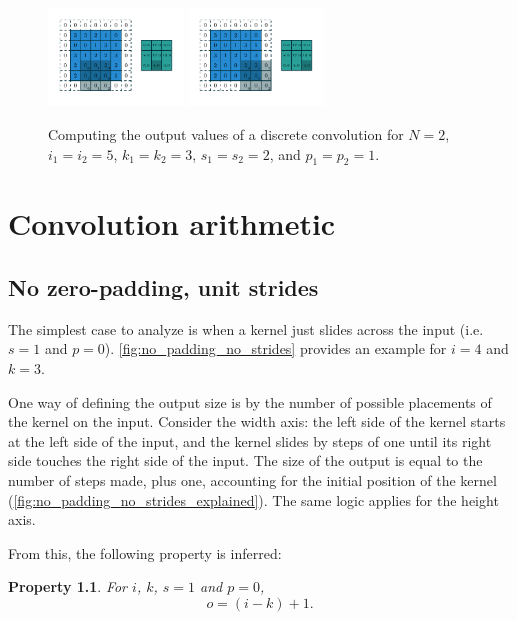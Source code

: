 \documentclass{report}
\newtheorem{prop}{Property}
\begin{document}
\begin{figure}[p]
    \includegraphics[width=0.32\textwidth]{pdf/numerical_padding_strides_07.pdf}
    \includegraphics[width=0.32\textwidth]{pdf/numerical_padding_strides_08.pdf}
    \caption{\label{fig:numerical_padding_strides} Computing the output values
        of a discrete convolution for $N = 2$, $i_1 = i_2 = 5$, $k_1 = k_2 = 3$,
        $s_1 = s_2 = 2$, and $p_1 = p_2 = 1$.}
\end{figure}

\chapter{Convolution arithmetic}

\section{No zero-padding, unit strides}

The simplest case to analyze is when a kernel just slides across the input (i.e.
$s = 1$ and $p = 0$). \autoref{fig:no_padding_no_strides} provides an example
for $i = 4$ and $k = 3$.

One way of defining the output size is by the number of possible placements of
the kernel on the input. Consider the width axis: the left side of the kernel
starts at the left side of the input, and the kernel slides by steps of one
until its right side touches the right side of the input. The size of the output
is equal to the number of steps made, plus one, accounting for the initial
position of the kernel (\autoref{fig:no_padding_no_strides_explained}). The same
logic applies for the height axis.

From this, the following property is inferred:

\begin{prop}\label{prop:no_padding_no_strides}
For $i$, $k$, $s = 1$ and $p = 0$,
\begin{equation*}
    o = (i - k) + 1.
\end{equation*}
\end{prop}
\end{document}
